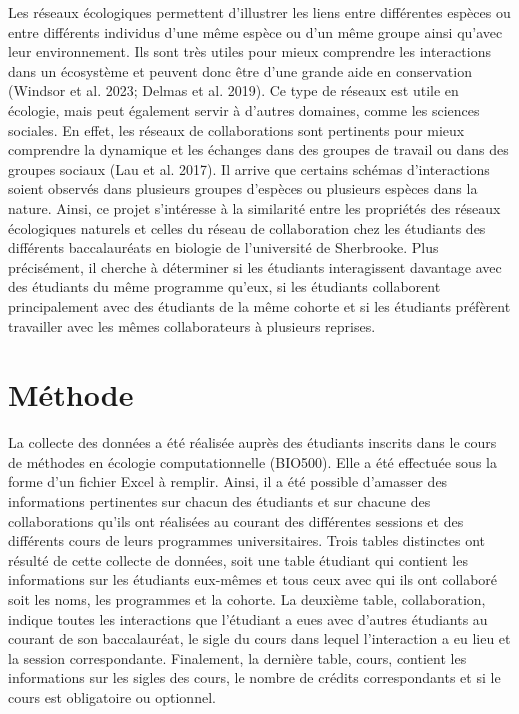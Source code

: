 \documentclass[9pt,twocolumn,twoside,]{pnas-new}
\begin{document}
Les réseaux écologiques permettent d'illustrer les liens entre
différentes espèces ou entre différents individus d'une même espèce ou
d'un même groupe ainsi qu'avec leur environnement. Ils sont très utiles
pour mieux comprendre les interactions dans un écosystème et peuvent
donc être d'une grande aide en conservation (Windsor et al. 2023; Delmas
et al. 2019). Ce type de réseaux est utile en écologie, mais peut
également servir à d'autres domaines, comme les sciences sociales. En
effet, les réseaux de collaborations sont pertinents pour mieux
comprendre la dynamique et les échanges dans des groupes de travail ou
dans des groupes sociaux (Lau et al. 2017). Il arrive que certains
schémas d'interactions soient observés dans plusieurs groupes d'espèces
ou plusieurs espèces dans la nature. Ainsi, ce projet s'intéresse à la
similarité entre les propriétés des réseaux écologiques naturels et
celles du réseau de collaboration chez les étudiants des différents
baccalauréats en biologie de l'université de Sherbrooke. Plus
précisément, il cherche à déterminer si les étudiants interagissent
davantage avec des étudiants du même programme qu'eux, si les étudiants
collaborent principalement avec des étudiants de la même cohorte et si
les étudiants préfèrent travailler avec les mêmes collaborateurs à
plusieurs reprises.

\hypertarget{muxe9thode}{%
\section{Méthode}\label{muxe9thode}}

La collecte des données a été réalisée auprès des étudiants inscrits
dans le cours de méthodes en écologie computationnelle (BIO500). Elle a
été effectuée sous la forme d'un fichier Excel à remplir. Ainsi, il a
été possible d'amasser des informations pertinentes sur chacun des
étudiants et sur chacune des collaborations qu'ils ont réalisées au
courant des différentes sessions et des différents cours de leurs
programmes universitaires. Trois tables distinctes ont résulté de cette
collecte de données, soit une table étudiant qui contient les
informations sur les étudiants eux-mêmes et tous ceux avec qui ils ont
collaboré soit les noms, les programmes et la cohorte. La deuxième
table, collaboration, indique toutes les interactions que l'étudiant a
eues avec d'autres étudiants au courant de son baccalauréat, le sigle du
cours dans lequel l'interaction a eu lieu et la session correspondante.
Finalement, la dernière table, cours, contient les informations sur les
sigles des cours, le nombre de crédits correspondants et si le cours est
obligatoire ou optionnel.
\end{document}
